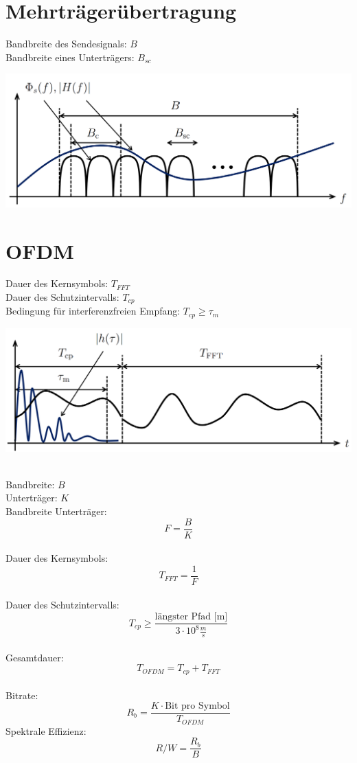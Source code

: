 \section{Mehrträgerübertragung}
Bandbreite des Sendesignals: $B$\\
Bandbreite eines Unterträgers: $B_{sc}$

\begin{center}
	\includegraphics[width=.9\textwidth]{./images/mehrtrager.png}
\end{center}

\section{OFDM}
Dauer des Kernsymbols: $T_{FFT}$ \\
Dauer des Schutzintervalls: $T_{cp}$ \\
Bedingung für interferenzfreien Empfang: $T_{cp} \geq \tau_m$
\begin{center}
	\includegraphics[width=.9\textwidth]{./images/ofdm.png}
\end{center}
~\\
Bandbreite: $B$ \\
Unterträger: $K$ \\
Bandbreite Unterträger:
\[
	F = \frac{B}{K}
\]
~\\
Dauer des Kernsymbols:
\[
	T_{FFT} = \frac{1}{F}
\]
~\\
Dauer des Schutzintervalls:
\[
	T_{cp} \geq \frac{\textrm{längster Pfad [m]}}{3\cdot 10^8 \frac{m}{s}}
\]
~\\
Gesamtdauer:
\[
	T_{OFDM} = T_{cp} + T_{FFT}
\]
~\\
Bitrate:
\[ 
	R_b = \frac{K \cdot \textrm{Bit pro Symbol}}{T_{OFDM}}
\]
Spektrale Effizienz:
\[
	R/W = \frac{R_b}{B}
\]